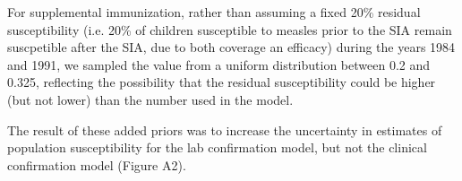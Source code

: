 For supplemental immunization, rather than assuming a fixed 20\% residual susceptibility (i.e. 20\% of children susceptible to measles prior to the SIA remain suscpetible after the SIA, due to both coverage an efficacy) during the years 1984 and 1991, we sampled the value from a uniform distribution between 0.2 and 0.325, reflecting the possibility that the residual susceptibility could be higher (but not lower) than the number used in the model.

The result of these added priors was to increase the uncertainty in estimates of population susceptibility for the lab confirmation model, but not the clinical confirmation model (Figure A2).